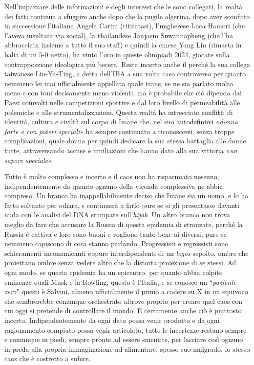 \documentclass[
  letterpaper,
  DIV=11,
  numbers=noendperiod]{scrartcl}
\begin{document}
Nell'impazzare delle informazioni e degli interessi che le sono
collegati, la realtà dei fatti continua a sfuggire anche dopo che la
pugile algerina, dopo aver sconfitto in successione l'italiana Angela
Carini (ritiratasi), l'ungherese Luca Hamori (che l'aveva insultata via
social), la thailandese Janjaem Suwannapheng (che l'ha abbracciata
insieme a tutto il suo staff) e quindi la cinese Yang Liu (rimasta in
balia di un 5-0 netto), ha vinto l'oro in queste olimpiadi 2024, giocate
sulla contrapposzione ideologica più becera. Resta incerto anche il
perché la sua collega taiwanese Lin-Yu-Ting, a detta dell'IBA a sua
volta caso controverso per quanto nemmeno lei mai ufficialmente
appellata quale trans, se ne sia parlato molto meno e con toni
decisamente meno violenti, ma è probabile che ciò dipenda dai Paesi
coinvolti nelle competizioni sportive e dal loro livello di permeabilità
alle polemiche e alle strumentalizzazioni. Questa realtà ha intrecciato
conflitti di identità, cultura e civiltà sul corpo di Imane che, nel suo
autodefinirsi «\emph{donna forte e con poteri speciali}» ha sempre
continuato a riconoscersi, senza troppe complicazioni, quale donna per
quindi dedicare la sua stessa battaglia alle donne tutte, attraversando
accuse e umiliazioni che hanno dato alla sua vittoria «\emph{un sapore
speciale}».

Tutto è molto complesso e incerto e il caos non ha risparmiato nessuno,
indipendentemente da quanto ognuno della vicenda complessiva ne abbia
compreso. Un branco ha inappellabilmente deciso che Imane sia un uomo, e
lo ha fatto soltanto per odiare, e continuerà a farlo pure se si gli
presentasse davanti nuda con le analisi del DNA stampate
sull'\emph{hijab}. Un altro branco non trova meglio da fare che accusare
la Russia di questa epidemia di stronzate, perché la Russia è cattiva e
loro sono buoni e vogliono tanto bene ai diversi, pure se nemmeno
capiscono di cosa stanno parlando. Progressisti e regressisti sono
schieramenti incomunicanti eppure interdipendenti di un \emph{logos}
sepolto, ombre che proiettano ombre senza vedere altro che la distorta
proiezione di se stessi. Ad ogni modo, se questa epidemia ha un
epicentro, per quanto abbia colpito eminenze quali Musk e la Rowling,
questo è l'Italia, e se conosce un ``\emph{paziente zero}'' questi è
Salvini, almeno ufficialmente il primo a cadere su X in un equivoco che
sembrerebbe comunque orchestrato altrove proprio per creare quel caos
con cui oggi si pretende di controllare il mondo. E certamente anche ciò
è piuttosto incerto. Indipendentemente da ogni dato possa venir prodotto
e da ogni ragionamento compiuto possa venir articolato, tutte le
incertezze restano sempre e comunque in piedi, sempre pronte ad essere
smentite, per lasciare così ognuno in preda alla propria immaginazione
ad alimentare, spesso suo malgrado, lo stesso caos che è costretto a
subire.
\end{document}
